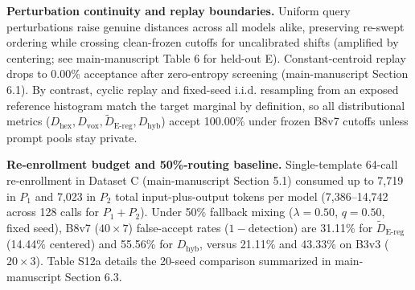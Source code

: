 \documentclass[10pt,letterpaper]{article}
\theoremstyle{definition}
\newcommand{\Dhex}{D_{\mathrm{hex}}}
\newcommand{\Dvox}{D_{\mathrm{vox}}}
\newcommand{\Dereg}{\tilde D_{\mathrm{E\mbox{-}reg}}}
\newcommand{\Dhyb}{D_{\mathrm{hyb}}}
\begin{document}
\textbf{Perturbation continuity and replay boundaries.} Uniform query perturbations raise genuine distances across all models alike, preserving re-swept ordering while crossing clean-frozen cutoffs for uncalibrated shifts (amplified by centering; see main-manuscript Table 6 for held-out E). Constant-centroid replay drops to 0.00\% acceptance after zero-entropy screening (main-manuscript Section 6.1). By contrast, cyclic replay and fixed-seed i.i.d. resampling from an exposed reference histogram match the target marginal by definition, so all distributional metrics ($\Dhex{}, \Dvox{}, \Dereg{}, \Dhyb{}$) accept 100.00\% under frozen B8v7 cutoffs unless prompt pools stay private.


\textbf{Re-enrollment budget and 50\%-routing baseline.} Single-template 64-call re-enrollment in Dataset C (main-manuscript Section 5.1) consumed up to 7,719 in $P_1$ and 7,023 in $P_2$ total input-plus-output tokens per model (7,386--14,742 across 128 calls for $P_1+P_2$). Under 50\% fallback mixing ($\lambda = 0.50$, $q=0.50$, fixed seed), B8v7 ($40\times 7$) false-accept rates ($1 - \text{detection}$) are 31.11\% for $\Dereg{}$ (14.44\% centered) and 55.56\% for $\Dhyb{}$, versus 21.11\% and 43.33\% on B3v3 ($20\times 3$). Table S12a details the 20-seed comparison summarized in main-manuscript Section 6.3.
\end{document}
